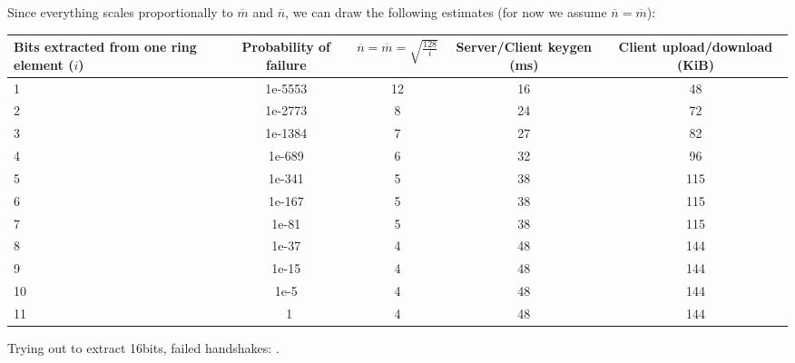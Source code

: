 \documentclass[12pt]{article}
\newcommand{\nbar}{\overline{n}}
\newcommand{\mbar}{\overline{m}}
\begin{document}
Since everything scales proportionally to $\mbar$ and $\nbar$, we can draw the following estimates (for now we assume $\nbar = \mbar$):
\begin{center}
    \begin{tabular}{|p{3cm}| c | c | c | c |}
    \hline
    Bits extracted from one ring element ($i$) & Probability of failure & $\nbar = \mbar = \sqrt{\frac{128}{i}}$ & Server/Client keygen (ms) & Client upload/download (KiB)\\ \hline
    1 & 1e-5553 & 12 & 16 & 48\\ \hline
    2 & 1e-2773 & 8 & 24 & 72\\ \hline
    3 & 1e-1384 & 7 & 27 & 82\\ \hline
    4 & 1e-689 & 6 & 32 & 96\\ \hline
    5 & 1e-341 & 5 & 38 & 115\\ \hline
    6 & 1e-167 & 5 & 38 & 115\\ \hline
    7 & 1e-81 & 5 & 38 & 115\\ \hline
    8 & 1e-37 & 4 & 48 & 144\\ \hline
    9 & 1e-15 & 4 & 48 & 144\\ \hline
    10 & 1e-5 & 4 & 48 & 144\\ \hline
    11 & ~1 & 4 & 48 & 144\\ \hline
    \end{tabular}
\end{center}

Trying out to extract 16bits, failed handshakes: .
\end{document}
